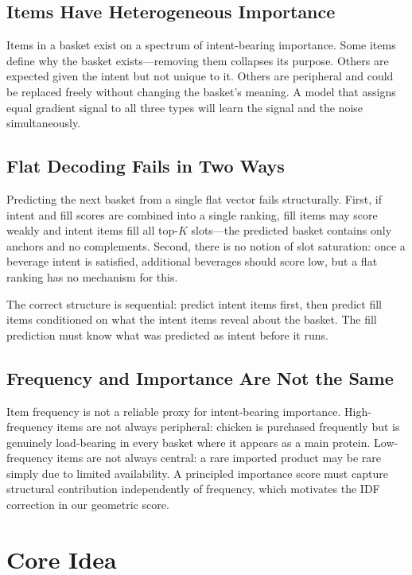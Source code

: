 \documentclass[conference]{IEEEtran}
\begin{document}
\subsection{Items Have Heterogeneous Importance}

Items in a basket exist on a spectrum of intent-bearing importance.
Some items define why the basket exists---removing them collapses its
purpose. Others are expected given the intent but not unique to it.
Others are peripheral and could be replaced freely without changing the
basket's meaning. A model that assigns equal gradient signal to all
three types will learn the signal and the noise simultaneously.

\subsection{Flat Decoding Fails in Two Ways}

Predicting the next basket from a single flat vector fails
structurally. First, if intent and fill scores are combined into a
single ranking, fill items may score weakly and intent items fill all
top-$K$ slots---the predicted basket contains only anchors and no
complements. Second, there is no notion of slot saturation: once a
beverage intent is satisfied, additional beverages should score low,
but a flat ranking has no mechanism for this.

The correct structure is sequential: predict intent items first, then
predict fill items conditioned on what the intent items reveal about the
basket. The fill prediction must know what was predicted as intent
before it runs.

\subsection{Frequency and Importance Are Not the Same}

Item frequency is not a reliable proxy for intent-bearing importance.
High-frequency items are not always peripheral: chicken is purchased
frequently but is genuinely load-bearing in every basket where it
appears as a main protein. Low-frequency items are not always central:
a rare imported product may be rare simply due to limited availability.
A principled importance score must capture structural contribution
independently of frequency, which motivates the IDF correction in our
geometric score.


\section{Core Idea}
\label{sec:idea}
\end{document}
